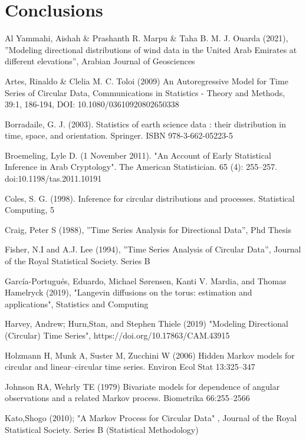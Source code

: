 \documentclass[11pt]{article}
\numberwithin{equation}{section}
\numberwithin{figure}{section}
\begin{document}
\section{Conclusions}
\begin{thebibliography}{1}

 Al Yammahi, Aishah \& Prashanth R. Marpu \& Taha B. M. J. Ouarda (2021), ''Modeling directional distributions of wind data in the United
Arab Emirates at different elevations'', Arabian Journal of Geosciences

 Artes, Rinaldo \& Clelia M. C. Toloi (2009) An Autoregressive Model for Time
Series of Circular Data, Communications in Statistics - Theory and Methods, 39:1, 186-194, DOI:
10.1080/03610920802650338

 Borradaile, G. J. (2003). Statistics of earth science data : their distribution in time, space, and orientation. Springer. ISBN 978-3-662-05223-5

 Broemeling, Lyle D. (1 November 2011). "An Account of Early Statistical Inference in Arab Cryptology". The American Statistician. 65 (4): 255–257. doi:10.1198/tas.2011.10191

 Coles, S. G. (1998). Inference for circular distributions and processes. Statistical Computing, 5

 Craig, Peter S (1988), ''Time Series Analysis for Directional Data'', Phd Thesis

 Fisher, N.I and A.J. Lee (1994), ''Time Series Analysis of Circular Data'', Journal of the Royal Statistical Society. Series B

  García-Portugués, Eduardo, Michael Sørensen, Kanti V. Mardia, and Thomas Hamelryck (2019), "Langevin diffusions on the torus: estimation and applications", Statistics and Computing

 Harvey, Andrew; Hurn,Stan, and Stephen Thiele (2019) "Modeling Directional (Circular) Time Series", https://doi.org/10.17863/CAM.43915

 Holzmann H, Munk A, Suster M, Zucchini W (2006) Hidden Markov models for circular and linear–circular
time series. Environ Ecol Stat 13:325–347

 Johnson RA, Wehrly TE (1979) Bivariate models for dependence of angular observations and a
related Markov process. Biometrika 66:255–2566

 Kato,Shogo (2010); "A Markov Process for Circular Data" , Journal of the Royal Statistical Society. Series B (Statistical Methodology)


\end{thebibliography}
\end{document}
